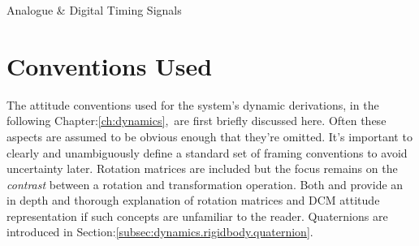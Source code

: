 \begin{table}[h]
\centering
{}
\caption{Analogue \& Digital Timing Signals}
\label{tab:servo}
\end{table}
\section{Conventions Used}
\label{sec:proto.conventions}
The attitude conventions used for the system's dynamic derivations, in the following Chapter:\ref{ch:dynamics},~are first briefly discussed here. Often these aspects are assumed to be obvious enough that they're omitted. It's important to clearly and unambiguously define a standard set of framing conventions to avoid uncertainty later. Rotation matrices are included but the focus remains on the \emph{contrast} between a rotation and transformation operation. Both \cite{spacecraftattitutdequaternions} and \cite{rigidbodylecture} provide an in depth and thorough explanation of rotation matrices and DCM attitude representation if such concepts are unfamiliar to the reader. Quaternions are introduced in Section:\ref{subsec:dynamics.rigidbody.quaternion}.
